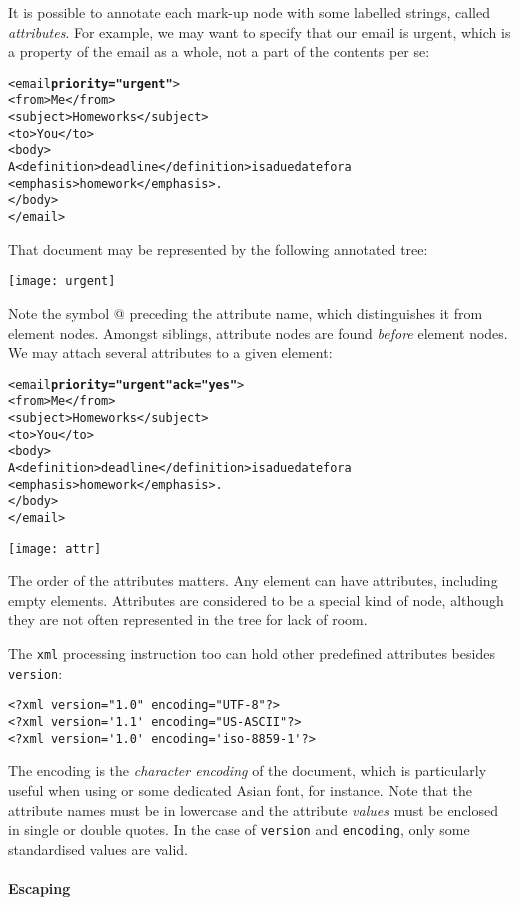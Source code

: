 It is possible to annotate each mark\hyp{}up node with some labelled
strings, called \emph{attributes}. For example, we may want to specify
that our email is urgent, which is a property of the email as a whole,
not a part of the contents per se:
\begin{alltt}
<email \textbf{priority="urgent"}>
  <from>Me</from>
  <subject>Homeworks</subject>
  <to>You</to>
  <body>
  A <definition>deadline</definition> is a due date for a
<emphasis>homework</emphasis>.
  </body>
</email>
\end{alltt}
That \XML document may be represented by the following annotated tree:
\begin{center}
\texttt{[image: urgent]}
\end{center}
Note the symbol \textsf{@} preceding the attribute name, which
distinguishes it from element nodes. Amongst siblings, attribute nodes
are found \emph{before}\label{attr_before} element nodes. We may
attach several attributes to a given element:
\begin{alltt}
<email \textbf{priority="urgent"} \textbf{ack="yes"}>
  <from>Me</from>
  <subject>Homeworks</subject>
  <to>You</to>
  <body>
  A <definition>deadline</definition> is a due date for a
<emphasis>homework</emphasis>.
  </body>
</email>
\end{alltt}
\begin{center}
\texttt{[image: attr]}
\end{center}
The order of the attributes matters. Any element can have attributes,
including empty elements. Attributes are considered to be a special
kind of node, although they are not often represented in the \XML tree
for lack of room.

The \texttt{xml} processing instruction too can hold other predefined
attributes besides \verb|version|:
\begin{verbatim}
<?xml version="1.0" encoding="UTF-8"?>
<?xml version='1.1' encoding="US-ASCII"?>
<?xml version='1.0' encoding='iso-8859-1'?>
\end{verbatim}
The encoding is the \emph{character encoding} of the \XML document,
which is particularly useful when using \Unicode or some dedicated
Asian font, for instance. Note that the attribute names must be in
lowercase and the attribute \emph{values} must be enclosed in single
or double quotes. In the case of \verb|version| and \verb|encoding|,
only some standardised values are valid.

\paragraph{Escaping}

